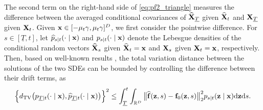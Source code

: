 \documentclass[11pt,a4paper,final]{article}
\numberwithin{equation}{section}
\theoremstyle{remark}
\newcommand{\bff}{{\bf f}}
\newcommand{\bx}{{\bf x}}
\newcommand{\bX}{{\bf X}}
\newcommand{\bz}{{\bf z}}
\newcommand{\bbR}{{\mathbb R}}
\newcommand{\Cov}{\mbox{{\rm Cov}}}
\newcommand{\bean}{\setlength\arraycolsep{1pt}\begin{eqnarray*}}
\newcommand{\eean}{\end{eqnarray*}}
\def\d{{\rm d}}
\begin{document}

The second term on the right-hand side of \eqref{eq:pf2_triangle} measures the difference between the averaged conditional covariances of $\widehat \bX_{\underline{T}}$ given $\widehat \bX_{t}$ and $\bX_{\underline{T}}$ given $\bX_{t}$.
Given $\bx \in [-\mu_{t}\gamma, \mu_{t}\gamma]^{D}$, we first consider the pointwise difference.
For $s \in [\underline{T}, t]$, let $\widehat p_{s \mid t} (\cdot \mid \bx)$ and $p_{s \mid t}(\cdot \mid \bx)$ denote the Lebesgue densities of the conditional random vectors $\widehat \bX_{s}$ given $\widehat \bX_{t} = \bx$ and $\bX_{s}$ given $\bX_{t} = \bx$, respectively.
Then, based on well-known results \citep{bogachev2016distances, le2016brownian, chen2023sampling}, the total variation distance between the solutions of the two SDEs can be bounded by controlling the difference between their drift terms, as
\bean
\Big\{ d_{\rm TV} \big( p_{\underline{T} \mid t} (\cdot \mid  \bx), \widehat p_{\underline{T} \mid t} (\cdot \mid \bx) \big) \Big\}^2
\leq  \int_{\underline{T}}^{t} \int_{\bbR^{D}}  \big\| \widehat \bff( \bz, s ) - \bff_{0} (\bz ,s) \big\|_2^{2} p_{s \mid t}(\bz \mid \bx) \d \bz \d s.
\eean
\end{document}
